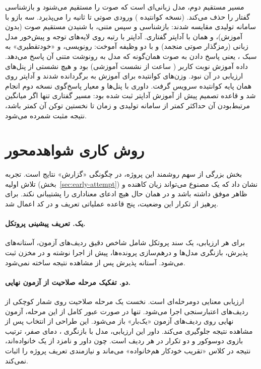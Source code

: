 مسیر مستقیم دوم، مدل زبانی‌ای است که صوت را مستقیم می‌شنود و بازشناسی گفتار
را حذف می‌کند.  (نسخه کوانتیده ) ورودی صوتی
تا  ثانیه را می‌پذیرد. سه بازو با سامانه تولیدی مقایسه شدند:
بازشناسی و سپس  متنی،  با شنیدن مستقیم صوت (بدون
آموزش)، و همان با آداپتر  گفتاری. آداپتر با رتبه  روی
لایه‌های توجه و پیش‌خور مدل زبانی (رمزگذار صوتی منجمد) و با دو وظیفه آموخت:
رونویسی، و «خودتقطیری» به سبک ، یعنی پاسخ دادن به صوت همان‌گونه که
مدل به رونوشت متنی آن پاسخ می‌دهد. داده آموزش  نوبت کاربر
( ساعت از  نشست آموزشی) بود و هیچ نشستی از پنل‌های ارزیابی
در آن نبود. وزن‌های کوانتیده برای آموزش به  برگردانده شدند و
آداپتر روی همان پایه کوانتیده سرویس گرفت. داوری با پنل‌ها و معیار
پاسخ‌گوی نسخه دوم انجام شد و قاعده تصمیم پیش از آموزش آداپتر ثبت شده بود:
مسیر گفتاری تنها اگر میانگین مرتبط‌بودن آن حداکثر  کمتر از سامانه
تولیدی و زمان تا نخستین توکن آن کمتر باشد، نتیجه مثبت شمرده می‌شود.

\section{روش کاری شواهد‌محور}
\label{sec:evidence-first}

بخش بزرگی از سهم روشمند این پروژه، در چگونگی «گزارش» نتایج است.
تجربه تلاش اولیه (\mbox{بخش~\ref{sec:early-attempt}}) نشان داد که یک مصنوع
می‌تواند زیان کاهنده و ظاهر موفق داشته باشد و در همان حال هیچ ادعای
معناداری را پشتیبانی نکند. برای پرهیز از تکرار این وضعیت، پنج قاعده
عملیاتی تعریف و در کد اعمال شد.

\paragraph{یک. تعریف پیشینی پروتکل.} برای هر ارزیابی، یک سند پروتکل شامل
شاخص دقیق ردیف‌های آزمون، آستانه‌های پذیرش، بازنگری مدل‌ها و درهم‌سازی
پرونده‌ها، پیش از اجرا نوشته و در مخزن ثبت می‌شود. آستانه پذیرش پس از
مشاهده نتیجه ساخته نمی‌شود.

\paragraph{دو. تفکیک مرحله صلاحیت از آزمون نهایی.} ارزیابی معنایی دو‌مرحله‌ای
است. نخست یک مرحله صلاحیت روی شمار کوچکی از ردیف‌های اعتبارسنجی اجرا
می‌شود. تنها در صورت عبور کامل از این مرحله، آزمون نهایی روی ردیف‌های
آزمون «یک‌بار» باز می‌شود. این طراحی از انتخاب پس از مشاهده نتیجه
جلوگیری می‌کند. داور این ارزیابی، مدل  با بازنگری
، دمای صفر، ترتیب بازوی
دوسوکور و دو تکرار در هر ردیف است. چون داور و نامزد از یک خانواده‌اند،
نتیجه در کلاس «تقریب خودکار هم‌خانواده» می‌ماند و نیازمندی تعریف پروژه را
اثبات نمی‌کند.

